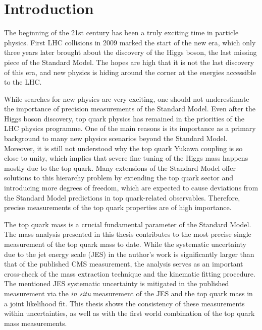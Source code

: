 
\chapter{Introduction}
\label{c:intro}
\ifpdf
    \graphicspath{{01_Introduction/plots/}}
\else
    \graphicspath{{01_Introduction/plots/EPS/}{01_Introduction/plots/}}
\fi

The beginning of the 21st century has been a truly exciting time in particle physics. First LHC collisions in 2009
marked the start of the new era, which only three years later brought about the discovery of the Higgs boson, the last
missing piece of the Standard Model. The hopes are high that it is not the last discovery of this era, and new physics
is hiding around the corner at the energies accessible to the LHC.

While searches for new physics are very exciting, one should not underestimate the importance of precision measurements
of the Standard Model. Even after the Higgs boson discovery, top quark physics has remained in the priorities of the LHC
physics programme. One of the main reasons is its importance as a primary background to many new physics scenarios
beyond the Standard Model. Moreover, it is still not understood why the top quark Yukawa coupling is so close to unity,
which implies that severe fine tuning of the Higgs mass happens mostly due to the top quark. Many extensions of the
Standard Model offer solutions to this hierarchy problem by extending the top quark sector and introducing more degrees
of freedom, which are expected to cause deviations from the Standard Model predictions in top quark-related observables.
Therefore, precise measurements of the top quark properties are of high importance.

The top quark mass is a crucial fundamental parameter of the Standard Model. The mass analysis presented in this thesis
contributes to the most precise single measurement of the top quark mass to date. While the systematic uncertainty due
to the jet energy scale (JES) in the author's work is significantly larger than that of the published CMS measurement,
the analysis serves as an important cross-check of the mass extraction technique and the kinematic fitting procedure.
The mentioned JES systematic uncertainty is mitigated in the published measurement via the \textit{in situ} measurement
of the JES and the top quark mass in a joint likelihood fit. This thesis shows the consistency of these measurements
within uncertainties, as well as with the first world combination of the top quark mass measurements.

